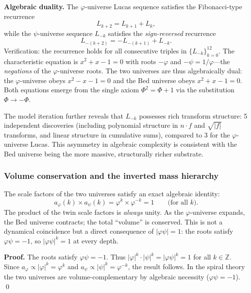 \documentclass[12pt,a4paper]{article}
\newcommand{\bed}{Bed universe}
\begin{document}
\medskip
\textbf{Algebraic duality.} The $\varphi$-universe Lucas sequence satisfies the Fibonacci-type recurrence
\begin{equation}
L_{k+2} = L_{k+1} + L_k, \label{eq:lucas-recurrence}
\end{equation}
while the $\psi$-universe sequence $L_{-k}$ satisfies the \emph{sign-reversed} recurrence
\begin{equation}
L_{-(k+2)} = -L_{-(k+1)} + L_{-k}. \label{eq:psi-recurrence}
\end{equation}
Verification: the recurrence holds for all consecutive triples in $\{L_{-k}\}_{k=0}^{12}$. The characteristic equation is $x^2 + x - 1 = 0$ with roots $-\varphi$ and $-\psi = 1/\varphi$---the \emph{negations} of the $\varphi$-universe roots. The two universes are thus algebraically dual: the $\varphi$-universe obeys $x^2 - x - 1 = 0$ and the \bed{} obeys $x^2 + x - 1 = 0$. Both equations emerge from the single axiom $\Phi^2 = \Phi + 1$ via the substitution $\Phi \to -\Phi$.

The model iteration further reveals that $L_{-k}$ possesses rich transform structure: 5 independent discoveries (including polynomial structure in $n \cdot f$ and $\sqrt{|f|}$ transforms, and linear structure in cumulative sums), compared to 3 for the $\varphi$-universe Lucas. This asymmetry in algebraic complexity is consistent with the \bed{} being the more massive, structurally richer substrate.

\subsubsection{Volume conservation and the inverted mass hierarchy}
\label{sec:psi-volume}

The scale factors of the two universes satisfy an exact algebraic identity:
\begin{equation}
\boxed{a_\varphi(k) \times a_\psi(k) = \varphi^k \times \varphi^{-k} = 1 \qquad \text{(for all } k\text{)}.}
\label{eq:volume-conservation}
\end{equation}
The product of the twin scale factors is \emph{always} unity.  As the $\varphi$-universe expands, the \bed{} contracts; the total ``volume'' is conserved.  This is not a dynamical coincidence but a direct consequence of $|\varphi\psi| = 1$: the roots satisfy $\varphi\psi = -1$, so $|\varphi\psi|^k = 1$ at every depth.

\textbf{Proof.}\;  The roots satisfy $\varphi\psi = -1$.  Thus $|\varphi|^k \cdot |\psi|^k = |\varphi\psi|^k = 1$ for all $k \in \mathbb{Z}$.  Since $a_\varphi \propto |\varphi|^k = \varphi^k$ and $a_\psi \propto |\psi|^k = \varphi^{-k}$, the result follows.  In the spiral theory the two universes are volume-complementary by algebraic necessity ($\varphi\psi = -1$). \qed
\end{document}
